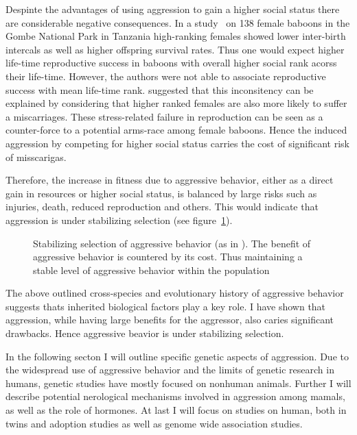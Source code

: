 Despinte the advantages of using aggression to gain a higher social status there are considerable negative consequences.
In a study~\cite{Packer1995} on 138 female baboons in the Gombe National Park in Tanzania high-ranking females showed lower inter-birth intercals as well as higher offspring survival rates.
Thus one would expect higher life-time reproductive success in baboons with overall higher social rank acorss their life-time.
However, the authors were not able to associate reproductive success with mean life-time rank.
\citet{Packer1995} suggested that this inconsitency can be explained by considering that higher ranked females are also more likely to suffer a  miscarriages.
These stress-related failure in reproduction can be seen as a counter-force to a potential arms-race among female baboons.
Hence the induced aggression by competing for higher social status carries the cost of significant risk of misscarigas.

Therefore, the increase in fitness due to aggressive behavior, either as a direct gain in resources or higher social status, is balanced by large risks such as injuries, death, reduced reproduction and others.
This would indicate that aggression is under stabilizing selection (see figure~\ref{fig:stab}).

\begin{figure}[hp]
	\centering
	\scalebox{0.6}{}
  \caption{Stabilizing selection of aggressive behavior (as in \citet{Anholt2012}). The benefit of aggressive behavior is countered by its cost. Thus maintaining a stable level of aggressive behavior within the population}\label{fig:stab}
\end{figure}

The above outlined cross-species and evolutionary history of aggressive behavior suggests thats inherited biological factors play a key role.
I have shown that aggression, while having large benefits for the aggressor, also caries significant drawbacks.
Hence aggressive beavior is under stabilizing selection.

In the following secton I will outline specific genetic aspects of aggression.
Due to the widespread use of aggressive behavior and the limits of genetic research in humans, genetic studies have mostly focused on nonhuman animals.
Further I will describe potential nerological mechanisms involved in aggression among mamals, as well as the role of hormones.
At last I will focus on studies on human, both in twins and adoption studies as well as genome wide association studies.


